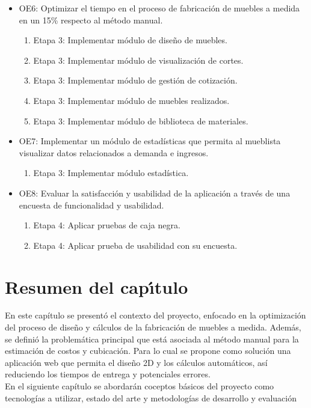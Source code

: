 ﻿\documentclass{iccmemoria}
\begin{document}
\begin{itemize}
\item OE6: Optimizar el tiempo en el proceso de fabricación de muebles a medida en un 15\% respecto al método manual.  
\begin{enumerate}
\item Etapa 3: Implementar módulo de diseño de muebles.
\item Etapa 3: Implementar módulo de visualización de cortes.
\item Etapa 3: Implementar módulo de gestión de cotización.
\item Etapa 3: Implementar módulo de muebles realizados.
\item Etapa 3: Implementar módulo de biblioteca de materiales.
\end{enumerate}

\item OE7: Implementar un módulo de estadísticas que permita al mueblista visualizar datos
relacionados a demanda e ingresos.
\begin{enumerate}
\item Etapa 3: Implementar módulo estadística.
\end{enumerate}

\item OE8: Evaluar la satisfacción y usabilidad de la aplicación a través de una encuesta de
funcionalidad y usabilidad.
\begin{enumerate}
\item Etapa 4: Aplicar pruebas de caja negra.
\item Etapa 4: Aplicar prueba de usabilidad con su encuesta.
\end{enumerate}
\end{itemize}

\section{Resumen del capı́tulo}
En este capítulo se presentó el contexto del proyecto, enfocado en la optimización del proceso de diseño y cálculos de la fabricación de muebles a medida. Además, se definió la problemática principal que está asociada al método manual para la estimación de costos y cubicación. Para lo cual se propone como solución una aplicación web que permita el diseño 2D y los cálculos automáticos, así reduciendo los tiempos de entrega y potenciales errores.\\
En el siguiente capítulo se abordarán coceptos básicos del proyecto como tecnologías a utilizar, estado del arte y metodologías de desarrollo y evaluación
\end{document}
